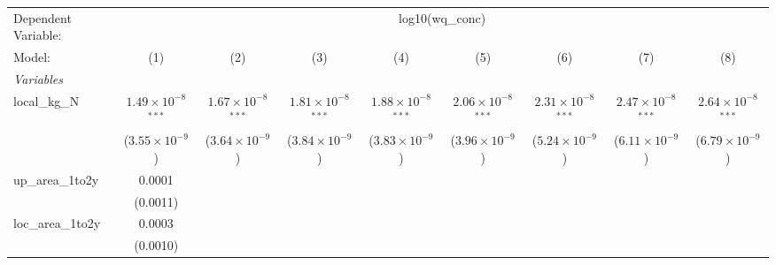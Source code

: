 
\begingroup
\centering
\begin{tabular}{lcccccccc}
   \tabularnewline \midrule \midrule
   Dependent Variable: & \multicolumn{8}{c}{log10(wq\_conc)}\\
   Model:                                      & (1)                           & (2)                           & (3)                           & (4)                           & (5)                           & (6)                           & (7)                           & (8)\\  
   \midrule
   \emph{Variables}\\
   local\_kg\_N                                & $1.49\times 10^{-8}$$^{***}$  & $1.67\times 10^{-8}$$^{***}$  & $1.81\times 10^{-8}$$^{***}$  & $1.88\times 10^{-8}$$^{***}$  & $2.06\times 10^{-8}$$^{***}$  & $2.31\times 10^{-8}$$^{***}$  & $2.47\times 10^{-8}$$^{***}$  & $2.64\times 10^{-8}$$^{***}$\\    
                                               & ($3.55\times 10^{-9}$)        & ($3.64\times 10^{-9}$)        & ($3.84\times 10^{-9}$)        & ($3.83\times 10^{-9}$)        & ($3.96\times 10^{-9}$)        & ($5.24\times 10^{-9}$)        & ($6.11\times 10^{-9}$)        & ($6.79\times 10^{-9}$)\\    
   up\_area\_1to2y                             & 0.0001                        &                               &                               &                               &                               &                               &                               &   \\   
                                               & (0.0011)                      &                               &                               &                               &                               &                               &                               &   \\   
   loc\_area\_1to2y                            & 0.0003                        &                               &                               &                               &                               &                               &                               &   \\   
                                               & (0.0010)                      &                               &                               &                               &                               &                               &                               &   \\   

\end{tabular}
